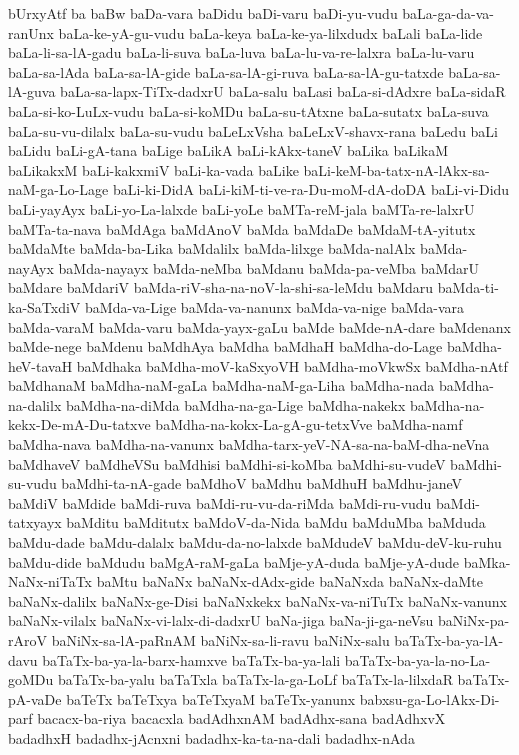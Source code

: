 {bUrxyAtf
ba
baBw
baDa-vara
baDidu
baDi-varu
baDi-yu-vudu
baLa-ga-da-va-ranUnx
baLa-ke-yA-gu-vudu
baLa-keya
baLa-ke-ya-lilxdudx
baLali
baLa-lide
baLa-li-sa-lA-gadu
baLa-li-suva
baLa-luva
baLa-lu-va-re-lalxra
baLa-lu-varu
baLa-sa-lAda
baLa-sa-lA-gide
baLa-sa-lA-gi-ruva
baLa-sa-lA-gu-tatxde
baLa-sa-lA-guva
baLa-sa-lapx-TiTx-dadxrU
baLa-salu
baLasi
baLa-si-dAdxre
baLa-sidaR
baLa-si-ko-LuLx-vudu
baLa-si-koMDu
baLa-su-tAtxne
baLa-sutatx
baLa-suva
baLa-su-vu-dilalx
baLa-su-vudu
baLeLxVsha
baLeLxV-shavx-rana
baLedu
baLi
baLidu
baLi-gA-tana
baLige
baLikA
baLi-kAkx-taneV
baLika
baLikaM
baLikakxM
baLi-kakxmiV
baLi-ka-vada
baLike
baLi-keM-ba-tatx-nA-lAkx-sa-naM-ga-Lo-Lage
baLi-ki-DidA
baLi-kiM-ti-ve-ra-Du-moM-dA-doDA
baLi-vi-Didu
baLi-yayAyx
baLi-yo-La-lalxde
baLi-yoLe
baMTa-reM-jala
baMTa-re-lalxrU
baMTa-ta-nava
baMdAga
baMdAnoV
baMda
baMdaDe
baMdaM-tA-yitutx
baMdaMte
baMda-ba-Lika
baMdalilx
baMda-lilxge
baMda-nalAlx
baMda-nayAyx
baMda-nayayx
baMda-neMba
baMdanu
baMda-pa-veMba
baMdarU
baMdare
baMdariV
baMda-riV-sha-na-noV-la-shi-sa-leMdu
baMdaru
baMda-ti-ka-SaTxdiV
baMda-va-Lige
baMda-va-nanunx
baMda-va-nige
baMda-vara
baMda-varaM
baMda-varu
baMda-yayx-gaLu
baMde
baMde-nA-dare
baMdenanx
baMde-nege
baMdenu
baMdhAya
baMdha
baMdhaH
baMdha-do-Lage
baMdha-heV-tavaH
baMdhaka
baMdha-moV-kaSxyoVH
baMdha-moVkwSx
baMdha-nAtf
baMdhanaM
baMdha-naM-gaLa
baMdha-naM-ga-Liha
baMdha-nada
baMdha-na-dalilx
baMdha-na-diMda
baMdha-na-ga-Lige
baMdha-nakekx
baMdha-na-kekx-De-mA-Du-tatxve
baMdha-na-kokx-La-gA-gu-tetxVve
baMdha-namf
baMdha-nava
baMdha-na-vanunx
baMdha-tarx-yeV-NA-sa-na-baM-dha-neVna
baMdhaveV
baMdheVSu
baMdhisi
baMdhi-si-koMba
baMdhi-su-vudeV
baMdhi-su-vudu
baMdhi-ta-nA-gade
baMdhoV
baMdhu
baMdhuH
baMdhu-janeV
baMdiV
baMdide
baMdi-ruva
baMdi-ru-vu-da-riMda
baMdi-ru-vudu
baMdi-tatxyayx
baMditu
baMditutx
baMdoV-da-Nida
baMdu
baMduMba
baMduda
baMdu-dade
baMdu-dalalx
baMdu-da-no-lalxde
baMdudeV
baMdu-deV-ku-ruhu
baMdu-dide
baMdudu
baMgA-raM-gaLa
baMje-yA-duda
baMje-yA-dude
baMka-NaNx-niTaTx
baMtu
baNaNx
baNaNx-dAdx-gide
baNaNxda
baNaNx-daMte
baNaNx-dalilx
baNaNx-ge-Disi
baNaNxkekx
baNaNx-va-niTuTx
baNaNx-vanunx
baNaNx-vilalx
baNaNx-vi-lalx-di-dadxrU
baNa-jiga
baNa-ji-ga-neVsu
baNiNx-pa-rAroV
baNiNx-sa-lA-paRnAM
baNiNx-sa-li-ravu
baNiNx-salu
baTaTx-ba-ya-lA-davu
baTaTx-ba-ya-la-barx-hamxve
baTaTx-ba-ya-lali
baTaTx-ba-ya-la-no-La-goMDu
baTaTx-ba-yalu
baTaTxla
baTaTx-la-ga-LoLf
baTaTx-la-lilxdaR
baTaTx-pA-vaDe
baTeTx
baTeTxya
baTeTxyaM
baTeTx-yanunx
babxsu-ga-Lo-lAkx-Di-parf
bacacx-ba-riya
bacacxla
badAdhxnAM
badAdhx-sana
badAdhxvX
badadhxH
badadhx-jAcnxni
badadhx-ka-ta-na-dali
badadhx-nAda
}
